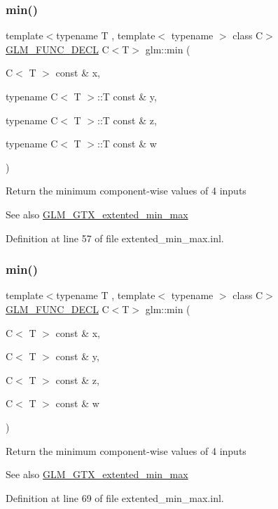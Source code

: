 \subsubsection{\texorpdfstring{min()}{min()}\hspace{0.1cm}{\footnotesize\ttfamily [5/6]}}
{\footnotesize\ttfamily template$<$typename T , template$<$ typename $>$ class C$>$ \\
\hyperlink{setup_8hpp_ab2d052de21a70539923e9bcbf6e83a51}{G\+L\+M\+\_\+\+F\+U\+N\+C\+\_\+\+D\+E\+CL} C$<$T$>$ glm\+::min (\begin{DoxyParamCaption}\item[{C$<$ T $>$ const \&}]{x,  }\item[{typename C$<$ T $>$\+::T const \&}]{y,  }\item[{typename C$<$ T $>$\+::T const \&}]{z,  }\item[{typename C$<$ T $>$\+::T const \&}]{w }\end{DoxyParamCaption})}

Return the minimum component-\/wise values of 4 inputs \begin{DoxySeeAlso}{See also}
\hyperlink{group__gtx__extented__min__max}{G\+L\+M\+\_\+\+G\+T\+X\+\_\+extented\+\_\+min\+\_\+max} 
\end{DoxySeeAlso}


Definition at line 57 of file extented\+\_\+min\+\_\+max.\+inl.

\mbox{\label{group__gtx__extented__min__max_ga7471ea4159eed8dd9ea4ac5d46c2fead}} 
\subsubsection{\texorpdfstring{min()}{min()}\hspace{0.1cm}{\footnotesize\ttfamily [6/6]}}
{\footnotesize\ttfamily template$<$typename T , template$<$ typename $>$ class C$>$ \\
\hyperlink{setup_8hpp_ab2d052de21a70539923e9bcbf6e83a51}{G\+L\+M\+\_\+\+F\+U\+N\+C\+\_\+\+D\+E\+CL} C$<$T$>$ glm\+::min (\begin{DoxyParamCaption}\item[{C$<$ T $>$ const \&}]{x,  }\item[{C$<$ T $>$ const \&}]{y,  }\item[{C$<$ T $>$ const \&}]{z,  }\item[{C$<$ T $>$ const \&}]{w }\end{DoxyParamCaption})}

Return the minimum component-\/wise values of 4 inputs \begin{DoxySeeAlso}{See also}
\hyperlink{group__gtx__extented__min__max}{G\+L\+M\+\_\+\+G\+T\+X\+\_\+extented\+\_\+min\+\_\+max} 
\end{DoxySeeAlso}


Definition at line 69 of file extented\+\_\+min\+\_\+max.\+inl.

